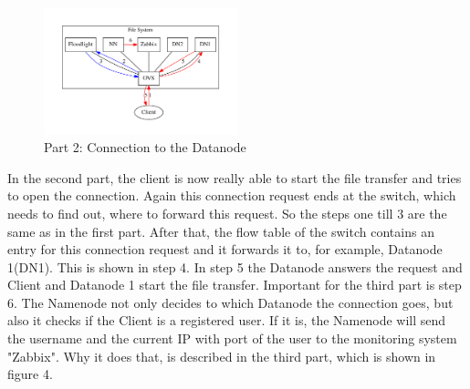 \begin{figure}[ht]
\centering
\includegraphics[width=0.5\textwidth]{img/connectionToDatanode} 
\caption{Part 2: Connection to the Datanode}
\label{dn}
\end{figure}     

In the second part, the client is now really able to start the file transfer and tries to open the connection. Again this connection request ends at the switch, which needs to find out, where to forward this request. So the steps one till 3 are the same as in the first part. After that, the flow table of the switch contains an entry for this connection request and it forwards it to, for example, Datanode 1(DN1). This is shown in step 4. In step 5 the Datanode answers the request and Client and Datanode 1 start the file transfer. Important for the third part is step 6. The Namenode not only decides to which Datanode the connection goes, but also it checks if the Client is a registered user. If it is, the Namenode will send the username and the current IP with port of the user to the monitoring system "Zabbix". Why it does that, is described in the third part, which is shown in figure 4.     
